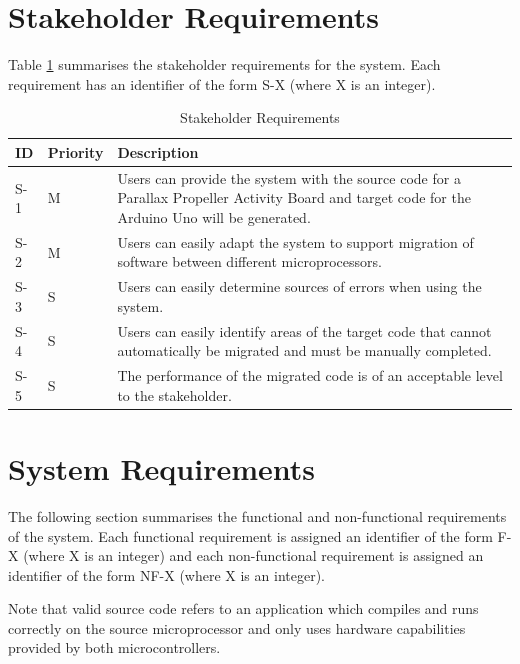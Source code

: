 \documentclass{UoYCSproject}
\newcommand{\ra}[1]{\renewcommand{\arraystretch}{#1}}
\begin{document}
\section{Stakeholder Requirements} \label{stakeholder_reqs}
Table \ref{table:stakeholder_req} summarises the stakeholder requirements for the system. Each requirement has an identifier of the form S-X (where X is an integer).
\begin{table}[h!]\centering
\caption{Stakeholder Requirements}
\ra{1.3}
  \begin{tabular}{@{}p{}p{}p{}@{}} \toprule 
  \textbf{ID} & \textbf{Priority} & \textbf{Description} \\
  \midrule
  S-1 & M & Users can provide the system with the source code for a Parallax Propeller Activity Board and target code for the Arduino Uno will be generated. \\ 
  S-2 & M & Users can easily adapt the system to support migration of software between different microprocessors. \\
  S-3 & S & Users can easily determine sources of errors when using the system. \\
  S-4 & S & Users can easily identify areas of the target code that cannot automatically be migrated and must be manually completed. \\
  S-5 & S & The performance of the migrated code is of an acceptable level to the stakeholder. \\
  \bottomrule
  \end{tabular}
\label{table:stakeholder_req}
\end{table}

\section{System Requirements} \label{sys_reqs}
The following section summarises the functional and non-functional requirements of the system. Each functional requirement is assigned an identifier of the form F-X (where X is an integer) and each non-functional requirement is assigned an identifier of the form NF-X (where X is an integer).

Note that valid source code refers to an application which compiles and runs correctly on the source microprocessor and only uses hardware capabilities provided by both microcontrollers.
\newpage
\end{document}
